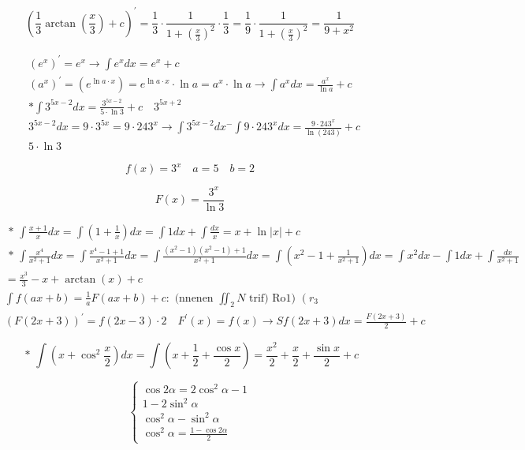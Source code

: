 \documentclass[10pt]{article}
\begin{document}
$$
\left(\frac{1}{3} \arctan \left(\frac{x}{3}\right)+c\right)^{\prime}=\frac{1}{3} \cdot \frac{1}{1+\left(\frac{x}{3}\right)^{2}} \cdot \frac{1}{3}=\frac{1}{9} \cdot \frac{1}{1+\left(\frac{x}{3}\right)^{2}}=\frac{1}{9+x^{2}}
$$

$$
\begin{aligned}
& \left(e^{x}\right)^{\prime}=e^{x} \rightarrow \int e^{x} d x=e^{x}+c \\
& \left(a^{x}\right)^{\prime}=\left(e^{\ln a \cdot x}\right)=e^{\ln a \cdot x} \cdot \ln a=a^{x} \cdot \ln a \rightarrow \int a^{x} d x=\frac{a^{x}}{\ln a}+c \\
& * \int 3^{5 x-2} d x=\frac{3^{5 x-2}}{5 \cdot \ln 3}+c \quad 3^{5 x+2} \\
& 3^{5 x-2} d x=9 \cdot 3^{5 x}=9 \cdot 243^{x} \rightarrow \int 3^{5 x-2} d x^{-} \int 9 \cdot 243^{x} d x=\frac{9 \cdot 243^{x}}{\ln (243)}+c \\
& 5 \cdot \ln 3
\end{aligned}
$$

$$
f(x)=3^{x} \quad a=5 \quad b=2
$$

$$
F(x)=\frac{3^{x}}{\ln 3}
$$

$$
\begin{aligned}
& \text { * } \int \frac{x+1}{x} d x=\int\left(1+\frac{1}{x}\right) d x=\int 1 d x+\int \frac{d x}{x}=x+\ln |x|+c \\
& \text { * } \int \frac{x^{4}}{x^{2}+1} d x=\int \frac{x^{4}-1+1}{x^{2}+1} d x=\int \frac{\left(x^{2}-1\right)\left(x^{2}-1\right)+1}{x^{2}+1} d x=\int\left(x^{2}-1+\frac{1}{x^{2}+1}\right) d x=\int x^{2} d x-\int 1 d x+\int \frac{d x}{x^{2}+1} \\
& =\frac{x^{3}}{3}-x+\arctan (x)+c \\
& \int f(a x+b)=\frac{1}{a} F(a x+b)+c: \text { (nnenen } \iint_{2} N \text { trif) Ro1) }\left(r_{3}\right. \\
& (F(2 x+3))^{\prime}=f(2 x-3) \cdot 2 \quad F^{\prime}(x)=f(x) \rightarrow S f(2 x+3) d x=\frac{F(2 x+3)}{2}+c
\end{aligned}
$$

$$
\text { * } \int\left(x+\cos ^{2} \frac{x}{2}\right) d x=\int\left(x+\frac{1}{2}+\frac{\cos x}{2}\right)=\frac{x^{2}}{2}+\frac{x}{2}+\frac{\sin x}{2}+c
$$

$$
\left\{\begin{array}{r}
\cos 2 \alpha=2 \cos ^{2} \alpha-1 \\
1-2 \sin ^{2} \alpha \\
\cos ^{2} \alpha-\sin ^{2} \alpha \\
\cos ^{2} \alpha=\frac{1-\cos 2 \alpha}{2}
\end{array}\right.
$$
\end{document}

